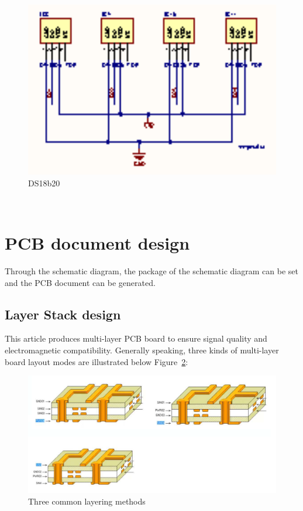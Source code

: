 \begin{figure}[!ht]
	\centering
	\includegraphics[width=16cm]{grafiken/ds18b20.eps}
	\caption{DS18b20} 
	\label{fig:6.9}
\end{figure}
\FloatBarrier
\\



\section{PCB document design}
\label{sec:PCB document design}
Through the schematic diagram, the package of the schematic diagram can be set and the PCB document can be generated.


\subsection{Layer Stack design}
\label{sec:Layer Stack design}

This article produces multi-layer PCB board to ensure signal quality and electromagnetic compatibility. Generally speaking, three kinds of multi-layer board layout modes are illustrated below Figure~\ref{fig:6.10}:
\begin{figure}[!ht]
	\centering
	\includegraphics[width=16cm]{grafiken/6.10.pdf}
	\caption{Three common layering methods} 
	\label{fig:6.10}
\end{figure}
\FloatBarrier
\\


